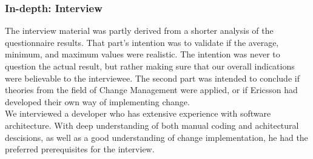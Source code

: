 \documentclass[final_report_innit.tex]{subfiles}
\begin{document}
\subsubsection{In-depth: Interview}\label{approachInInt}
The interview material was partly derived from a shorter analysis of the questionnaire results. That part's intention was to validate if the average, minimum, and maximum values were realistic. The intention was never to question the actual result, but rather making sure that our overall indications were believable to the interviewee. The second part was intended to conclude if theories from the field of Change Management were applied, or if Ericsson had developed their own way of implementing change.
\\

We interviewed a developer who has extensive experience with software architecture. With deep understanding of both manual coding and achitectural descisions, as well as a good understanding of change implementation, he had the preferred prerequisites for the interview.
\end{document}
